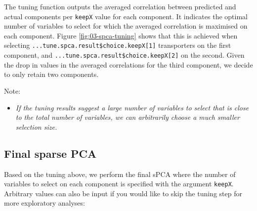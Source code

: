 \documentclass[
]{book}
\newenvironment{Shaded}{\begin{snugshade}}{\end{snugshade}}
\newcommand{\AttributeTok}[1]{\textcolor[rgb]{0.77,0.63,0.00}{#1}}
\newcommand{\CommentTok}[1]{\textcolor[rgb]{0.56,0.35,0.01}{\textit{#1}}}
\newcommand{\DecValTok}[1]{\textcolor[rgb]{0.00,0.00,0.81}{#1}}
\newcommand{\FunctionTok}[1]{\textcolor[rgb]{0.00,0.00,0.00}{#1}}
\newcommand{\NormalTok}[1]{#1}
\newcommand{\OtherTok}[1]{\textcolor[rgb]{0.56,0.35,0.01}{#1}}
\newcommand{\SpecialCharTok}[1]{\textcolor[rgb]{0.00,0.00,0.00}{#1}}
\providecommand{\tightlist}{%
  \setlength{\itemsep}{0pt}\setlength{\parskip}{0pt}}
\begin{document}
The tuning function outputs the averaged correlation between predicted and actual components per \texttt{keepX} value for each component. It indicates the optimal number of variables to select for which the averaged correlation is maximised on each component. Figure \ref{fig:03-spca-tuning} shows that this is achieved when selecting \texttt{...tune.spca.result\$choice.keepX{[}1{]}} transporters on the first component, and \texttt{...tune.spca.result\$choice.keepX{[}2{]}} on the second. Given the drop in values in the averaged correlations for the third component, we decide to only retain two components.

Note:

\begin{itemize}
\tightlist
\item
  \emph{If the tuning results suggest a large number of variables to select that is close to the total number of variables, we can arbitrarily choose a much smaller selection size.}
\end{itemize}

\hypertarget{03:spca-final}{%
\subsection{Final sparse PCA}\label{03:spca-final}}

Based on the tuning above, we perform the final sPCA where the number of variables to select on each component is specified with the argument \texttt{keepX}. Arbitrary values can also be input if you would like to skip the tuning step for more exploratory analyses:

\begin{Shaded}
\end{Shaded}
\end{document}
